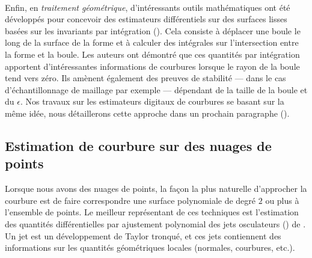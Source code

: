 \paragraph{}
%
Enfin, en \emph{traitement géométrique}, d'intéressants outils
mathématiques ont été développés pour concevoir des estimateurs différentiels
sur des surfaces lisses basées sur les invariants par intégration
(). Cela consiste à déplacer
une boule le long de la surface de la forme et à calculer des intégrales sur
l'intersection entre la forme et la boule. Les auteurs ont démontré que ces
quantités par intégration apportent d'intéressantes informations de courbures
lorsque le rayon de la boule tend vers zéro. Ils amènent également des preuves
de stabilité --- dans le cas d'échantillonnage de maillage par exemple ---
dépendant de la taille de la boule et du $\epsilon$. Nos travaux sur les
estimateurs digitaux de courbures se basant sur la même idée, nous détaillerons cette approche dans un prochain paragraphe ().
%
\subsection{Estimation de courbure sur des nuages de points}
%
Lorsque nous avons des nuages de points, la façon la plus naturelle d'approcher
la courbure est de faire correspondre une surface polynomiale de degré $2$ ou
plus à l'ensemble de points. Le meilleur représentant de ces techniques est l'estimation des quantités différentielles par ajustement polynomial des jets osculateurs () de .
%
\\
%
Un jet est un développement de Taylor tronqué, et ces jets contiennent des
informations sur les quantités géométriques locales (normales, courbures, etc.).



